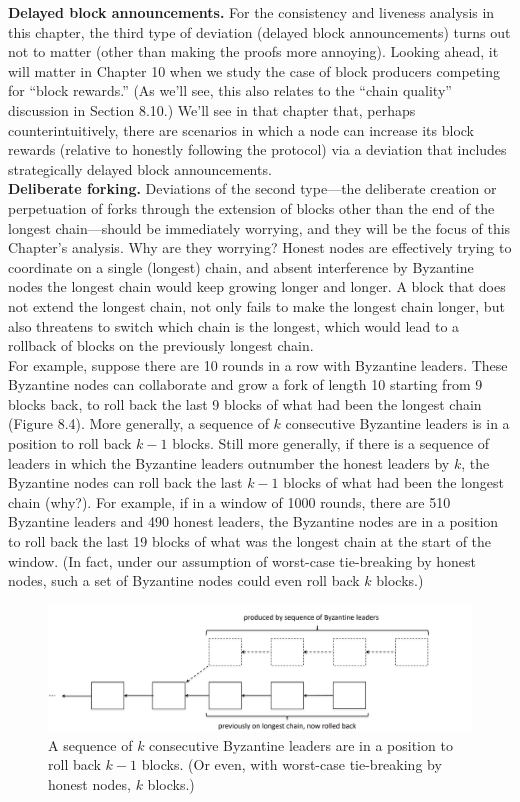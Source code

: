 \noindent
\textbf{Delayed block announcements.} For the consistency and liveness analysis in this chapter, the third type of deviation (delayed block announcements) turns out not
to matter (other than making the proofs more annoying). Looking ahead, it will matter in
Chapter 10 when we study the case of block producers competing for “block rewards.” (As
we’ll see, this also relates to the “chain quality” discussion in Section 8.10.) We’ll see in that
chapter that, perhaps counterintuitively, there are scenarios in which a node can increase
its block rewards (relative to honestly following the protocol) via a deviation that includes
strategically delayed block announcements.\\

\noindent
\textbf{Deliberate forking.} Deviations of the second type—the deliberate creation or perpetuation of forks through the extension of blocks other than the end of the longest chain—should
be immediately worrying, and they will be the focus of this Chapter’s analysis. Why are they
worrying? Honest nodes are effectively trying to coordinate on a single (longest) chain, and
absent interference by Byzantine nodes the longest chain would keep growing longer and
longer. A block that does not extend the longest chain, not only fails to make the longest
chain longer, but also threatens to switch which chain is the longest, which would lead to a
rollback of blocks on the previously longest chain.\\
For example, suppose there are 10 rounds in a row with Byzantine leaders. These Byzantine nodes can collaborate and grow a fork of length 10 starting from 9 blocks back, to roll
back the last 9 blocks of what had been the longest chain (Figure 8.4). More generally, a
sequence of $k$ consecutive Byzantine leaders is in a position to roll back $k - 1$ blocks. Still more generally, if there is a sequence of leaders in which the Byzantine leaders outnumber
the honest leaders by $k$, the Byzantine nodes can roll back the last $k - 1$ blocks of what had
been the longest chain (why?). For example, if in a window of 1000 rounds, there are 510
Byzantine leaders and 490 honest leaders, the Byzantine nodes are in a position to roll back
the last 19 blocks of what was the longest chain at the start of the window. (In fact, under
our assumption of worst-case tie-breaking by honest nodes, such a set of Byzantine nodes
could even roll back $k$ blocks.)\\
\begin{figure}[h]
    \centering
    \includegraphics[scale = 0.5]{figures/f25.png}
    \caption{ A sequence of $k$ consecutive Byzantine leaders are in a position to roll back $k − 1$
blocks. (Or even, with worst-case tie-breaking by honest nodes, $k$ blocks.)}
    \label{fig:mesh1}
\end{figure}\\
